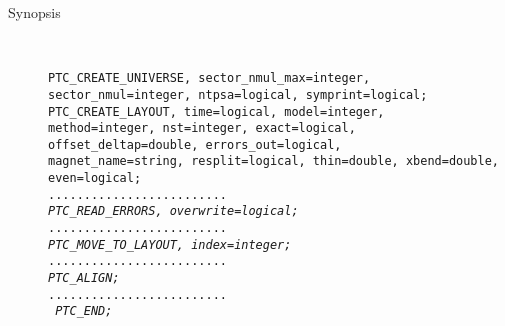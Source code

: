 \begin{description}
	\item[Synopsis] 
	\textbf{\\}

\texttt{PTC\_CREATE\_UNIVERSE, sector\_nmul\_max=integer, \\
sector\_nmul=integer, ntpsa=logical, symprint=logical;}\\
\texttt{PTC\_CREATE\_LAYOUT, time=logical, model=integer,\\
method=integer, nst=integer, exact=logical, \\
offset\_deltap=double, errors\_out=logical, \\
magnet\_name=string, resplit=logical, thin=double, xbend=double,      \\ even=logical;}\\
\texttt{.........................}\\
\textit{\texttt{PTC\_READ\_ERRORS, overwrite=logical;}}\\
\texttt{.........................}\\
\textit{\texttt{PTC\_MOVE\_TO\_LAYOUT, index=integer;}}\\
\texttt{.........................}\\
\textit{\texttt{PTC\_ALIGN;}}\\
\texttt{.........................}\\
\textit{\texttt{ PTC\_END;}}\\
\end{description}
